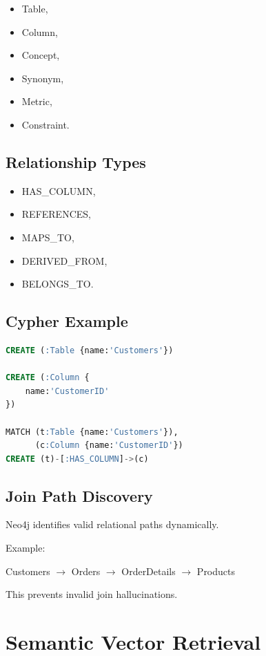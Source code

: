\documentclass[11pt,a4paper]{article}
\begin{document}
\begin{itemize}
    \item Table,
    \item Column,
    \item Concept,
    \item Synonym,
    \item Metric,
    \item Constraint.
\end{itemize}

\subsection{Relationship Types}

\begin{itemize}
    \item HAS\_COLUMN,
    \item REFERENCES,
    \item MAPS\_TO,
    \item DERIVED\_FROM,
    \item BELONGS\_TO.
\end{itemize}

\subsection{Cypher Example}

\begin{lstlisting}[language=SQL]
CREATE (:Table {name:'Customers'})

CREATE (:Column {
    name:'CustomerID'
})

MATCH (t:Table {name:'Customers'}),
      (c:Column {name:'CustomerID'})
CREATE (t)-[:HAS_COLUMN]->(c)
\end{lstlisting}

\subsection{Join Path Discovery}

Neo4j identifies valid relational paths dynamically.

Example:
\begin{center}
Customers $\rightarrow$ Orders $\rightarrow$ OrderDetails $\rightarrow$ Products
\end{center}

This prevents invalid join hallucinations.

\section{Semantic Vector Retrieval}
\end{document}
